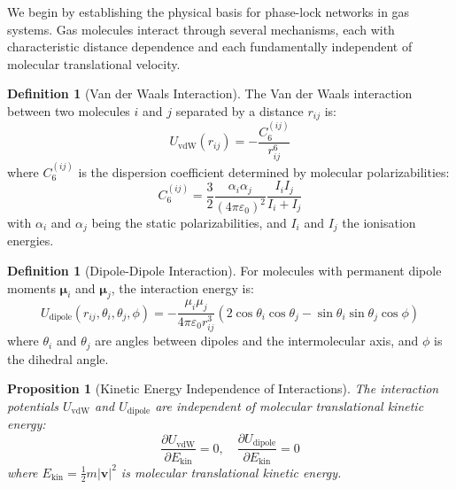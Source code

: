 \documentclass[12pt,a4paper]{article}
\newtheorem{proposition}[theorem]{Proposition}
\theoremstyle{definition}
\newtheorem{definition}[theorem]{Definition}
\theoremstyle{remark}
\begin{document}
We begin by establishing the physical basis for phase-lock networks in gas systems. Gas molecules interact through several mechanisms, each with characteristic distance dependence and each fundamentally independent of molecular translational velocity.

\begin{definition}[Van der Waals Interaction]
\label{def:vdw}
The Van der Waals interaction between two molecules $i$ and $j$ separated by a distance $r_{ij}$ is:
\begin{equation}
U_{\text{vdW}}(r_{ij}) = -\frac{C_6^{(ij)}}{r_{ij}^6}
\label{eq:vdw_potential}
\end{equation}
where $C_6^{(ij)}$ is the dispersion coefficient determined by molecular polarizabilities:
\begin{equation}
C_6^{(ij)} = \frac{3}{2} \frac{\alpha_i \alpha_j}{(4\pi\varepsilon_0)^2} \frac{I_i I_j}{I_i + I_j}
\label{eq:c6_coefficient}
\end{equation}
with $\alpha_i$ and $\alpha_j$ being the static polarizabilities, and $I_i$ and $I_j$ the ionisation energies.
\end{definition}

\begin{definition}[Dipole-Dipole Interaction]
\label{def:dipole}
For molecules with permanent dipole moments $\boldsymbol{\mu}_i$ and $\boldsymbol{\mu}_j$, the interaction energy is:
\begin{equation}
U_{\text{dipole}}(r_{ij}, \theta_i, \theta_j, \phi) = -\frac{\mu_i \mu_j}{4\pi\varepsilon_0 r_{ij}^3} \left( 2\cos\theta_i \cos\theta_j - \sin\theta_i \sin\theta_j \cos\phi \right)
\label{eq:dipole_potential}
\end{equation}
where $\theta_i$ and $\theta_j$ are angles between dipoles and the intermolecular axis, and $\phi$ is the dihedral angle.
\end{definition}

\begin{proposition}[Kinetic Energy Independence of Interactions]
\label{prop:kinetic_independence_interactions}
The interaction potentials $U_{\text{vdW}}$ and $U_{\text{dipole}}$ are independent of molecular translational kinetic energy:
\begin{equation}
\frac{\partial U_{\text{vdW}}}{\partial E_{\text{kin}}} = 0, \quad \frac{\partial U_{\text{dipole}}}{\partial E_{\text{kin}}} = 0
\end{equation}
where $E_{\text{kin}} = \frac{1}{2}m|\mathbf{v}|^2$ is molecular translational kinetic energy.
\end{proposition}
\end{document}
